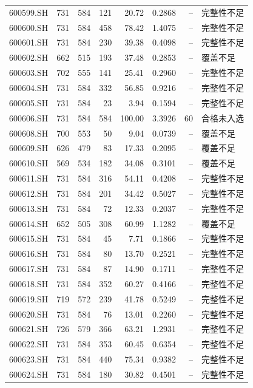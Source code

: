 \documentclass[10pt,a4paper]{article}
\begin{document}
\begin{longtable}{lrrr r r r l}
600599.SH & 731 & 584 & 121 & 20.72 & 0.2868 & -- & 完整性不足\\
600600.SH & 731 & 584 & 458 & 78.42 & 1.4075 & -- & 完整性不足\\
600601.SH & 731 & 584 & 230 & 39.38 & 0.4098 & -- & 完整性不足\\
600602.SH & 662 & 515 & 193 & 37.48 & 0.2853 & -- & 覆盖不足\\
600603.SH & 702 & 555 & 141 & 25.41 & 0.2960 & -- & 完整性不足\\
600604.SH & 731 & 584 & 332 & 56.85 & 0.9216 & -- & 完整性不足\\
600605.SH & 731 & 584 & 23 & 3.94 & 0.1594 & -- & 完整性不足\\
600606.SH & 731 & 584 & 584 & 100.00 & 3.3926 & 60 & 合格未入选\\
600608.SH & 700 & 553 & 50 & 9.04 & 0.0739 & -- & 覆盖不足\\
600609.SH & 626 & 479 & 83 & 17.33 & 0.2095 & -- & 覆盖不足\\
600610.SH & 569 & 534 & 182 & 34.08 & 0.3101 & -- & 覆盖不足\\
600611.SH & 731 & 584 & 316 & 54.11 & 0.4208 & -- & 完整性不足\\
600612.SH & 731 & 584 & 201 & 34.42 & 0.5027 & -- & 完整性不足\\
600613.SH & 731 & 584 & 72 & 12.33 & 0.2037 & -- & 完整性不足\\
600614.SH & 652 & 505 & 308 & 60.99 & 1.1282 & -- & 覆盖不足\\
600615.SH & 731 & 584 & 45 & 7.71 & 0.1866 & -- & 完整性不足\\
600616.SH & 731 & 584 & 80 & 13.70 & 0.2521 & -- & 完整性不足\\
600617.SH & 731 & 584 & 87 & 14.90 & 0.1711 & -- & 完整性不足\\
600618.SH & 731 & 584 & 352 & 60.27 & 0.4166 & -- & 完整性不足\\
600619.SH & 719 & 572 & 239 & 41.78 & 0.5249 & -- & 完整性不足\\
600620.SH & 731 & 584 & 76 & 13.01 & 0.2260 & -- & 完整性不足\\
600621.SH & 726 & 579 & 366 & 63.21 & 1.2931 & -- & 完整性不足\\
600622.SH & 731 & 584 & 353 & 60.45 & 0.6354 & -- & 完整性不足\\
600623.SH & 731 & 584 & 440 & 75.34 & 0.9382 & -- & 完整性不足\\
600624.SH & 731 & 584 & 180 & 30.82 & 0.4501 & -- & 完整性不足\\

\end{longtable}
\end{document}
